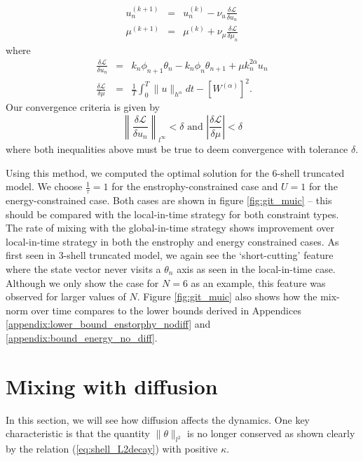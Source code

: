 \begin{eqnarray}
	\label{eq:update_scheme}
	u^{(k+1)}_{n}&=&u^{(k)}_{n}-\nu_{u} \frac{\delta \mathcal{L}}{\delta u_{n}} \\
	\mu^{(k+1)}&=&\mu^{(k)}+\nu_{\mu} \frac{\delta \mathcal{L}}{\delta \mu_{n}}
\end{eqnarray}
where
\begin{eqnarray}
	\frac{\delta \mathcal{L}}{\delta u_{n}}&=& k_{n}\phi_{n+1}\theta_{n} - k_{n}\phi_{n}\theta_{n+1}+\mu k_{n}^{2\alpha}u_{n} \\
	\frac{\delta \mathcal{L}}{\delta \mu}&=& \frac{1}{T}\int_{0}^{T}\|u\|_{h^{\alpha}} dt - [W^{(\alpha)}]^{2}.
\end{eqnarray}
Our convergence criteria is given by
\[
	\left \| \frac{\delta \mathcal{L}}{\delta u_{n}}\right\|_{l^{\infty}}<\delta  \text{ and }
	\left|\frac{\delta \mathcal{L}}{\delta \mu}\right|<\delta
\]
where both inequalities above must be true to deem convergence with tolerance $\delta$.

Using this method, we computed the optimal solution for the 6-shell truncated model. We choose $\frac{1}{\tau} = 1$ for the enstrophy-constrained case and $U=1$ for the energy-constrained case.  Both cases are shown in figure \ref{fig:git_muic} -- this should be compared with the local-in-time strategy for both constraint types. The rate of mixing with the global-in-time strategy shows improvement over local-in-time strategy in both the enstrophy and energy constrained cases. As first seen in 3-shell truncated model, we again see the `short-cutting' feature where the state vector never visits a $\theta_{n}$ axis as seen in the local-in-time case. Although we only show the case for  $N =6$ as an example, this feature was observed for larger values of $N$. Figure \ref{fig:git_muic} also shows how the mix-norm over time compares to the lower bounds derived in Appendices \ref{appendix:lower_bound_enstorphy_nodiff} and \ref{appendix:bound_energy_no_diff}.



\section{Mixing with diffusion}
\label{sec:diffusivecase}

In this section, we will see how diffusion affects the dynamics. One key characteristic is that the quantity $\|\theta\|_{l^{2}}$ is no longer conserved as shown clearly by the relation (\ref{eq:shell_L2decay}) with positive $\kappa$.

